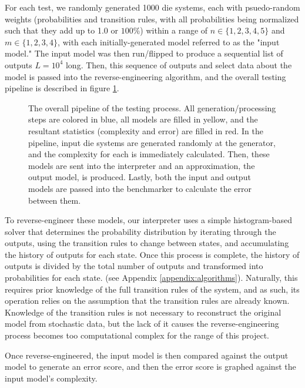 \documentclass[12pt]{article}
\begin{document}
For each test, we randomly generated 1000 die systems, each with psuedo-random weights (probabilities and transition rules, with all probabilities being normalized such that they add up to 1.0 or $100\%$) within a range of $n \in \{1, 2, 3, 4, 5\}$ and $m \in \{1, 2, 3, 4\}$, with each initially-generated model referred to as the "input model." The input model was then run/flipped to produce a sequential list of outputs $L=10^4$ long. Then, this sequence of outputs and select data about the model is passed into the reverse-engineering algorithm, and the overall testing pipeline is described in figure \ref{fig:core-pipeline}.

\begin{figure}[H]
\centering
\resizebox{0.7\textwidth}{!}{}
\label{fig:core-pipeline}
\caption{The overall pipeline of the testing process. All generation/processing steps are colored in blue, all models are filled in yellow, and the resultant statistics (complexity and error) are filled in red. In the pipeline, input die systems are generated randomly at the generator, and the complexity for each is immediately calculated. Then, these models are sent into the interpreter and an approximation, the output model, is produced. Lastly, both the input and output models are passed into the benchmarker to calculate the error between them.}
\end{figure}

To reverse-engineer these models, our interpreter uses a simple histogram-based solver that determines the probability distribution by iterating through the outputs, using the transition rules to change between states, and accumulating the history of outputs for each state. Once this process is complete, the history of outputs is divided by the total number of outputs and transformed into probabilities for each state. (see Appendix \ref{appendix:algorithms}). Naturally, this requires prior knowledge of the full transition rules of the system, and as such, its operation relies on the assumption that the transition rules are already known. Knowledge of the transition rules is not necessary to reconstruct the original model from stochastic data, but the lack of it causes the reverse-engineering process becomes too computational complex for the range of this project. 

Once reverse-engineered, the input model is then compared against the output model to generate an error score, and then the error score is graphed against the input model's complexity.
\end{document}
